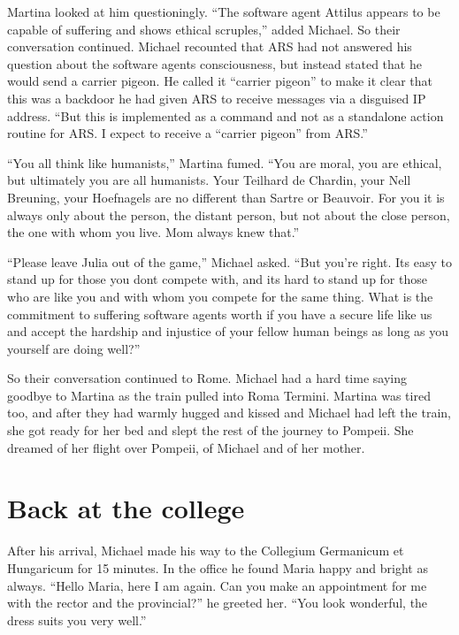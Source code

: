 \documentclass[
]{article}
\begin{document}
Martina looked at him questioningly. ``The software agent Attilus
appears to be capable of suffering and shows ethical scruples,'' added
Michael. So their conversation continued. Michael recounted that ARS had
not answered his question about the software agents\textquotesingle{}
consciousness, but instead stated that he would send a carrier pigeon.
He called it ``carrier pigeon'' to make it clear that this was a
backdoor he had given ARS to receive messages via a disguised IP
address. ``But this is implemented as a command and not as a standalone
action routine for ARS. I expect to receive a ``carrier pigeon'' from
ARS.''

``You all think like humanists,'' Martina fumed. ``You are moral, you
are ethical, but ultimately you are all humanists. Your Teilhard de
Chardin, your Nell Breuning, your Hoefnagels are no different than
Sartre or Beauvoir. For you it is always only about the person, the
distant person, but not about the close person, the one with whom you
live. Mom always knew that.''

``Please leave Julia out of the game,'' Michael asked. ``But you're
right. It\textquotesingle s easy to stand up for those you
don\textquotesingle t compete with, and it\textquotesingle s hard to
stand up for those who are like you and with whom you compete for the
same thing. What is the commitment to suffering software agents worth if
you have a secure life like us and accept the hardship and injustice of
your fellow human beings as long as you yourself are doing well?''

So their conversation continued to Rome. Michael had a hard time saying
goodbye to Martina as the train pulled into Roma Termini. Martina was
tired too, and after they had warmly hugged and kissed and Michael had
left the train, she got ready for her bed and slept the rest of the
journey to Pompeii. She dreamed of her flight over Pompeii, of Michael
and of her mother.

\section{Back at the college}\label{back-at-the-college}

After his arrival, Michael made his way to the Collegium Germanicum et
Hungaricum for 15 minutes. In the office he found Maria happy and bright
as always. ``Hello Maria, here I am again. Can you make an appointment
for me with the rector and the provincial?'' he greeted her. ``You look
wonderful, the dress suits you very well.''
\end{document}
